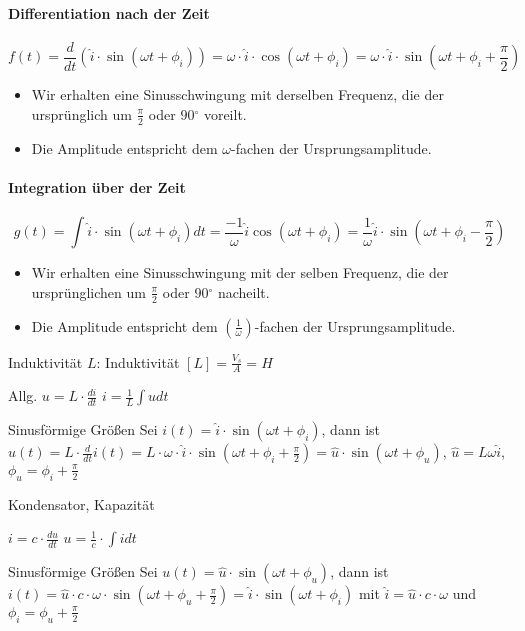 \documentclass[german]{article}
\newcommand{\degree}{\ensuremath{^\circ}}
\begin{document}
\paragraph{Differentiation nach der Zeit}
\[ f(t) = \frac{d}{dt} ( \hat{i} \cdot \sin(\omega t + \phi_i) ) = \omega \cdot \hat{i} \cdot \cos(\omega t + \phi_i) = \omega \cdot \hat{i} \cdot \sin(\omega t + \phi_i + \frac{\pi}2 ) \]
\begin{itemize}
	\item Wir erhalten eine Sinusschwingung mit derselben Frequenz, die der ursprünglich um $\frac{\pi}2$ oder $90\degree$ voreilt.
	\item Die Amplitude entspricht dem $\omega$-fachen der Ursprungsamplitude.
\end{itemize}

\paragraph{Integration über der Zeit}
\[ g(t) = \int \hat{i} \cdot \sin(\omega t + \phi_i) dt = \frac{-1}{\omega} \hat{i} \cos(\omega t + \phi_i) = \frac1{\omega} \hat{i} \cdot \sin(\omega t + \phi_i - \frac{\pi}2) \]
\begin{itemize}
	\item Wir erhalten eine Sinusschwingung mit der selben Frequenz, die der ursprünglichen um $\frac{\pi}2$ oder $90\degree$ nacheilt.
	\item Die Amplitude entspricht dem $\left( \frac1{\omega} \right)$-fachen der Ursprungsamplitude.
\end{itemize}

Induktivität
$L$: Induktivität
$[L] = \frac{V_s}A = H$


Allg. $u = L \cdot \frac{di}{dt}$ $i = \frac1L \int u dt$

Sinusförmige Größen
Sei $i(t) = \hat{i} \cdot \sin(\omega t + \phi_i)$, dann ist $u(t) = L \cdot \frac{d}{dt} i(t) = L \cdot \omega \cdot \hat{i} \cdot \sin(\omega t + \phi_i + \frac{\pi}2) = \hat{u} \cdot \sin(\omega t + \phi_u)$, $\hat{u} = L \omega \hat{i}$, $\phi_u = \phi_i + \frac{\pi}2$

Kondensator, Kapazität

$i = c \cdot \frac{du}{dt}$
$u = \frac1c \cdot \int i dt$

Sinusförmige Größen
Sei $u(t) = \hat{u} \cdot \sin(\omega t + \phi_u)$, dann ist $i(t) = \hat{u} \cdot c \cdot \omega \cdot \sin(\omega t + \phi_u + \frac{\pi}2) = \hat{i} \cdot \sin(\omega t + \phi_i)$ mit $\hat{i} = \hat{u} \cdot c \cdot \omega$ und $\phi_i = \phi_u + \frac{\pi}2$
\end{document}
